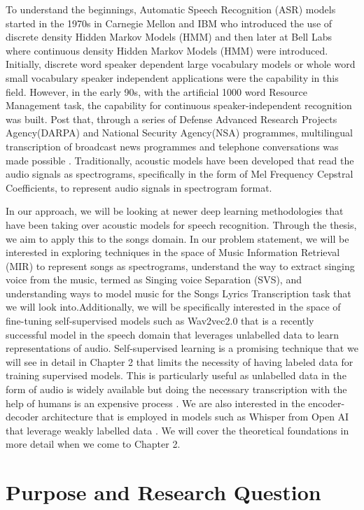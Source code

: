 To understand the beginnings, Automatic Speech Recognition (ASR) models started in the 1970s in Carnegie Mellon and IBM who introduced the use of discrete density Hidden Markov Models (HMM) and then later at Bell Labs where continuous density Hidden Markov Models (HMM) were introduced. Initially, discrete word speaker dependent large vocabulary models or whole word small vocabulary speaker independent applications were the capability in this field. However, in the early 90s, with the artificial 1000 word Resource Management task, the capability for continuous speaker-independent recognition was built. Post that, through a series of Defense Advanced Research Projects Agency(DARPA) and National Security Agency(NSA) programmes, multilingual transcription of broadcast news programmes and telephone conversations was made possible \cite{gales2008application}. Traditionally, acoustic models have been developed that read the audio signals as spectrograms, specifically in the form of Mel Frequency Cepstral Coefficients, to represent audio signals in spectrogram format. 

In our approach, we will be looking at newer deep learning methodologies that have been taking over acoustic models for speech recognition. Through the thesis, we aim to apply this to the songs domain. In our problem statement, we will be interested in exploring techniques in the space of Music Information Retrieval (MIR) to represent songs as spectrograms, understand the way to extract singing voice from the music, termed as Singing voice Separation (SVS), and understanding ways to model music for the Songs Lyrics Transcription task that we will look into.Additionally, we will be specifically interested in the space of fine-tuning self-supervised models such as Wav2vec2.0 that is a recently successful model in the speech domain that leverages unlabelled data to learn representations of audio. Self-supervised learning is a promising technique that we will see in detail in Chapter 2 that limits the necessity of having labeled data for training supervised models. This is particularly useful as unlabelled data in the form of audio is widely available but doing the necessary transcription with the help of humans is an expensive process \cite{baevski2020wav2vec}. We are also interested in the encoder-decoder architecture that is employed in models such as Whisper from Open AI that leverage weakly labelled data \cite{radford2023robust}. We will cover the theoretical foundations in more detail when we come to Chapter 2.

\section{Purpose and Research Question}%
\label{sec:purpose}

